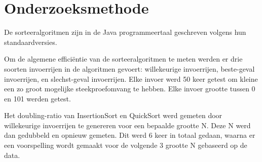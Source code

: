 \section{Onderzoeksmethode}

De sorteeralgoritmen zijn in de Java programmeertaal geschreven volgens hun standaardversies.

Om de algemene efficiëntie van de sorteeralgoritmen te meten werden er drie soorten invoerrijen in de algoritmen gevoert: willekeurige invoerrijen, beste-geval invoerrijen, en slechst-geval invoerrijen. Elke invoer werd 50 keer getest om kleine een zo groot mogelijke steekproefomvang te hebben. Elke invoer grootte tussen 0 en 101 werden getest.

Het doubling-ratio van InsertionSort en QuickSort werd gemeten door willekeurige invoerrijen te genereren voor een bepaalde grootte N. Deze N werd dan gedubbeld en opnieuw gemeten. Dit werd 6 keer in totaal gedaan, waarna er een voorspelling wordt gemaakt voor de volgende 3 grootte N gebaseerd op de data.

